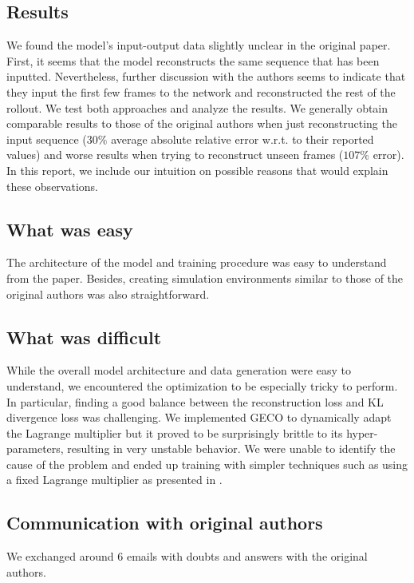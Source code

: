 \subsection*{Results}
We found the model's input-output data slightly unclear in the original paper.
First, it seems that the model reconstructs the same sequence that has been inputted.
Nevertheless, further discussion with the authors seems to indicate that they input the first few frames to the network and reconstructed the rest of the rollout.
We test both approaches and analyze the results.
We generally obtain comparable results to those of the original authors when just reconstructing the input sequence ($30\%$ average absolute relative error w.r.t. to their reported values) and worse results when trying to reconstruct unseen frames ($107\%$ error).
In this report, we include our intuition on possible reasons that would explain these observations.


\subsection*{What was easy}
The architecture of the model and training procedure was easy to understand from the paper.
Besides, creating simulation environments similar to those of the original authors was also straightforward. 

\subsection*{What was difficult}
While the overall model architecture and data generation were easy to understand, we encountered the optimization to be especially tricky to perform.
In particular, finding a good balance between the reconstruction loss and KL divergence loss was challenging.
We implemented GECO \cite{geco} to dynamically adapt the Lagrange multiplier but it proved to be surprisingly brittle to its hyper-parameters, resulting in very unstable behavior.
We were unable to identify the cause of the problem and ended up training with simpler techniques such as using a fixed Lagrange multiplier as presented in \cite{beta-vae}.

\subsection*{Communication with original authors}
We exchanged around 6 emails with doubts and answers with the original authors.


\newpage










